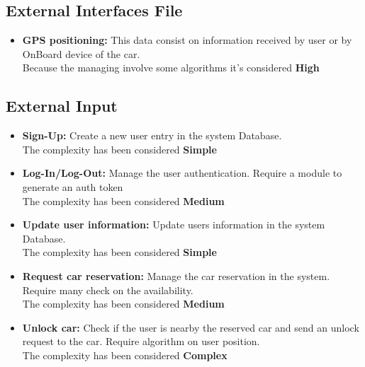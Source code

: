 \subsection{External Interfaces File} 

\begin{itemize}
	\item \textbf{GPS positioning:} This data consist on information received by user or by OnBoard device of the car. \\Because the managing involve some algorithms it's considered \textbf{High}
\end{itemize}


\subsection{External Input} 
\begin{itemize}
	\item \textbf{Sign-Up:} Create a new user entry in the system Database. \\The complexity has been considered \textbf{Simple}
	\item \textbf{Log-In/Log-Out:} Manage the user authentication. Require a module to generate an auth token\\The complexity has been considered \textbf{Medium}
	\item \textbf{Update user information:} Update users information in the system Database. \\The complexity has been considered \textbf{Simple}
	\item \textbf{Request car reservation:} Manage the car reservation in the system. Require many check on the availability.  \\The complexity has been considered \textbf{Medium}
	\item \textbf{Unlock car:} Check if the user is nearby the reserved car and send an unlock request to the car. Require algorithm on user position.  \\The complexity has been considered \textbf{Complex}
\end{itemize}


